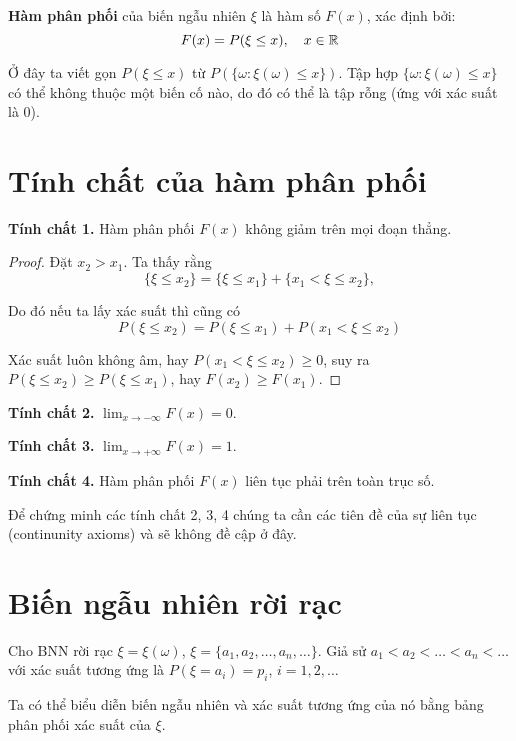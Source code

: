 \begin{definition}
    \textbf{Hàm phân phối} của biến ngẫu nhiên $\xi$ là hàm số $F(x)$, xác định bởi:
    \begin{equation}
        F(x) = P(\xi \leq x), \quad x \in \mathbb{R}
    \end{equation}
\end{definition}

Ở đây ta viết gọn $P(\xi \leq x)$ từ $P(\{ \omega: \xi(\omega) \leq x \})$. Tập hợp $\{ \omega: \xi(\omega) \leq x\}$ có thể không thuộc một biến cố nào, do đó có thể là tập rỗng (ứng với xác suất là 0).
\section{Tính chất của hàm phân phối}

\textbf{Tính chất 1.} Hàm phân phối $F(x)$ không giảm trên mọi đoạn thẳng.

\begin{proof}
    Đặt $x_2 > x_1$. Ta thấy rằng \[\{ \xi \leq x_2 \} = \{ \xi \leq x_1 \} + \{ x_1 < \xi \leq x_2 \},\]
    
    Do đó nếu ta lấy xác suất thì cũng có \[ P(\xi \leq x_2) = P(\xi \leq x_1) + P(x_1 < \xi \leq x_2) \]

    Xác suất luôn không âm, hay $P(x_1 < \xi \leq x_2) \geq 0$, suy ra $P(\xi \leq x_2) \geq P(\xi \leq x_1)$, hay $F(x_2) \geq F(x_1)$.
\end{proof}

\textbf{Tính chất 2.} $\displaystyle{\lim_{x \to -\infty} F(x) = 0}$.

\textbf{Tính chất 3.} $\displaystyle{\lim_{x \to +\infty} F(x) = 1}$.

\textbf{Tính chất 4.} Hàm phân phối $F(x)$ liên tục phải trên toàn trục số.

Để chứng minh các tính chất 2, 3, 4 chúng ta cần các tiên đề của sự liên tục (continunity axioms) và sẽ không đề cập ở đây.

\section{Biến ngẫu nhiên rời rạc}

Cho BNN rời rạc $\xi = \xi(\omega)$, $\xi = \{ a_1, a_2, \ldots, a_n, \ldots \}$. Giả sử $a_1 < a_2 < \ldots < a_n < \ldots$ với xác suất tương ứng là $P(\xi = a_i) = p_i$, $i = 1, 2, \ldots$

Ta có thể biểu diễn biến ngẫu nhiên và xác suất tương ứng của nó bằng bảng phân phối xác suất của $\xi$.

